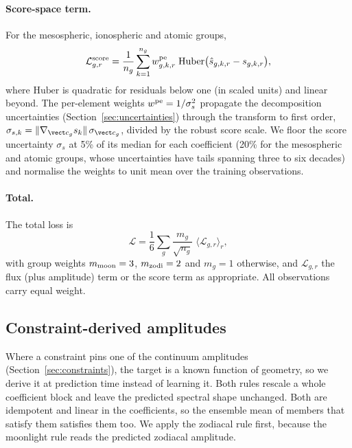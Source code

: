 \paragraph{Score-space term.} For the mesospheric, ionospheric and atomic
groups,
\begin{equation}
  \mathcal{L}^{\rm score}_{g,r} = \frac{1}{n_g}\sum_{k=1}^{n_g} w^{\rm pe}_{g,k,r}\;
  \mathrm{Huber}\big(\hat s_{g,k,r}-s_{g,k,r}\big),
\end{equation}
where $\mathrm{Huber}$ is quadratic for residuals below one (in scaled units)
and linear beyond. The per-element weights $w^{\rm pe} = 1/\sigma_s^2$
propagate the decomposition uncertainties (Section~\ref{sec:uncertainties})
through the transform to first order,
$\sigma_{s,k} = \lVert\nabla_{\vect c_g} s_k\rVert\,\sigma_{\vect c_g}$,
divided by the robust score scale. We floor the score uncertainty $\sigma_s$
at 5\% of its median for each coefficient (20\% for the mesospheric and
atomic groups, whose uncertainties have tails spanning three to six decades)
and normalise the weights to unit mean over the training observations.

\paragraph{Total.} The total loss is
\begin{equation}
  \mathcal{L} = \frac{1}{6}\sum_g \frac{m_g}{\sqrt{n_g}}\;
  \Big\langle \mathcal{L}_{g,r}\Big\rangle_r ,
\end{equation}
with group weights $m_{\rm moon} = 3$, $m_{\rm zodi} = 2$ and $m_g = 1$
otherwise, and $\mathcal{L}_{g,r}$ the flux (plus amplitude) term or the
score term as appropriate. All observations carry equal weight.

\subsection{Constraint-derived amplitudes}
\label{sec:rules}

Where a constraint pins one of the continuum amplitudes
(Section~\ref{sec:constraints}), the target is a known function of geometry,
so we derive it at prediction time instead of learning it. Both rules rescale
a whole coefficient block and leave the predicted spectral shape unchanged.
Both are idempotent and linear in the coefficients, so the ensemble mean of
members that satisfy them satisfies them too. We apply the zodiacal rule
first, because the moonlight rule reads the predicted zodiacal amplitude.

